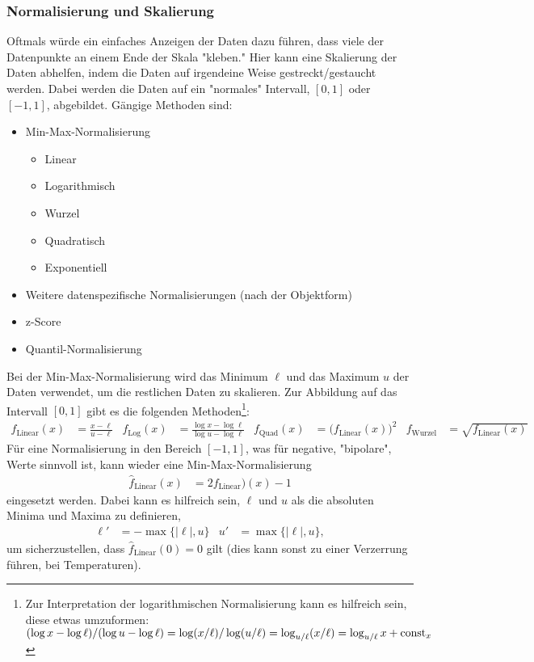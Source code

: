 			\subsubsection{Normalisierung und Skalierung}
				Oftmals würde ein einfaches Anzeigen der Daten dazu führen, dass viele der Datenpunkte an einem Ende der Skala "kleben." Hier kann eine Skalierung der Daten abhelfen, indem die Daten auf irgendeine Weise gestreckt/gestaucht werden. Dabei werden die Daten auf ein "normales" Intervall, \zB \([0, 1]\) oder \([-1, 1]\), abgebildet. Gängige Methoden sind:
				\begin{itemize}
					\item Min-Max-Normalisierung
						\begin{itemize}
							\item Linear
							\item Logarithmisch
							\item Wurzel
							\item Quadratisch
							\item Exponentiell
						\end{itemize}
					\item Weitere datenspezifische Normalisierungen (\bspw nach der Objektform)
					\item z-Score
					\item Quantil-Normalisierung
				\end{itemize}
				Bei der Min-Max-Normalisierung wird das Minimum \(\ell\) und das Maximum \(u\) der Daten verwendet, um die restlichen Daten zu skalieren. Zur Abbildung auf das Intervall \( [0, 1] \) gibt es \zB die folgenden Methoden\footnote{Zur Interpretation der logarithmischen Normalisierung kann es hilfreich sein, diese etwas umzuformen: \( (\log x - \log \ell) / (\log u - \log \ell) = \log(x/\ell) / \log(u/\ell) = \log_{u/\ell}(x/\ell) = \log_{u/\ell} x + \operatorname{const}_x \)}:
				\begin{align}
					f_\text{Linear}(x) &= \frac{x - \ell}{u - \ell} &
					f_\text{Log}(x) &= \frac{\log x - \log \ell}{\log u - \log \ell} &
					f_\text{Quad}(x) &= \bigl( f_\text{Linear}(x) \bigr)^2 &
					f_\text{Wurzel} &= \sqrt{f_\text{Linear}(x)}
				\end{align}
				Für eine Normalisierung in den Bereich \( [-1, 1] \), was für negative, "bipolare", Werte sinnvoll ist, kann \zB wieder eine Min-Max-Normalisierung
				\begin{align}
					\hat{f}_\text{Linear}(x) &= 2 f_\text{Linear})(x) - 1
				\end{align}
				eingesetzt werden. Dabei kann es hilfreich sein, \(\ell\) und \(u\) als die absoluten Minima und Maxima zu definieren, \dh
				\begin{align}
					\ell' &= -\max\{ \lvert \ell \rvert, u \} &
					u' &= \max\{ \lvert \ell \rvert, u \},
				\end{align}
				um sicherzustellen, dass \( \hat{f}_\text{Linear}(0) = 0 \) gilt (dies kann sonst zu einer Verzerrung führen, \bspw bei Temperaturen).

